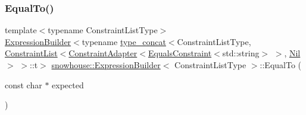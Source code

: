 \subsubsection{\texorpdfstring{EqualTo()}{EqualTo()}\hspace{0.1cm}{\footnotesize\ttfamily [2/2]}}
{\footnotesize\ttfamily template$<$typename Constraint\+List\+Type$>$ \\
\mbox{\hyperlink{structsnowhouse_1_1ExpressionBuilder}{Expression\+Builder}}$<$typename \mbox{\hyperlink{structsnowhouse_1_1type__concat}{type\+\_\+concat}}$<$Constraint\+List\+Type, \mbox{\hyperlink{structsnowhouse_1_1ConstraintList}{Constraint\+List}}$<$\mbox{\hyperlink{structsnowhouse_1_1ConstraintAdapter}{Constraint\+Adapter}}$<$\mbox{\hyperlink{structsnowhouse_1_1EqualsConstraint}{Equals\+Constraint}}$<$std\+::string$>$ $>$, \mbox{\hyperlink{structsnowhouse_1_1Nil}{Nil}}$>$ $>$\+::t$>$ \mbox{\hyperlink{structsnowhouse_1_1ExpressionBuilder}{snowhouse\+::\+Expression\+Builder}}$<$ Constraint\+List\+Type $>$\+::Equal\+To (\begin{DoxyParamCaption}\item[{const char $\ast$}]{expected }\end{DoxyParamCaption})\hspace{0.3cm}{\ttfamily [inline]}}

\mbox{\label{structsnowhouse_1_1ExpressionBuilder_af215471e68bff7147af608e1ee7e67c9}} 
